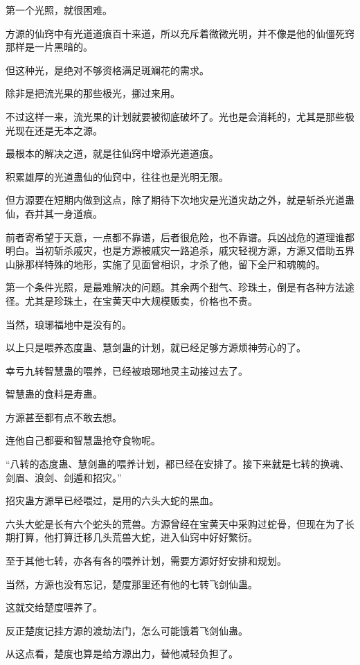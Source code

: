 \begin{this_body}
第一个光照，就很困难。

方源的仙窍中有光道道痕百十来道，所以充斥着微微光明，并不像是他的仙僵死窍那样是一片黑暗的。

但这种光，是绝对不够资格满足斑斓花的需求。

除非是把流光果的那些极光，挪过来用。

不过这样一来，流光果的计划就要被彻底破坏了。光也是会消耗的，尤其是那些极光现在还是无本之源。

最根本的解决之道，就是往仙窍中增添光道道痕。

积累雄厚的光道蛊仙的仙窍中，往往也是光明无限。

但方源要在短期内做到这点，除了期待下次地灾是光道灾劫之外，就是斩杀光道蛊仙，吞并其一身道痕。

前者寄希望于天意，一点都不靠谱，后者很危险，也不靠谱。兵凶战危的道理谁都明白。当初斩杀戚灾，也是方源被戚灾一路追杀，戚灾轻视方源，方源又借助五界山脉那样特殊的地形，实施了见面曾相识，才杀了他，留下全尸和魂魄的。

第一个条件光照，是最难解决的问题。其余两个甜气、珍珠土，倒是有各种方法途径。尤其是珍珠土，在宝黄天中大规模贩卖，价格也不贵。

当然，琅琊福地中是没有的。

以上只是喂养态度蛊、慧剑蛊的计划，就已经足够方源烦神劳心的了。

幸亏九转智慧蛊的喂养，已经被琅琊地灵主动接过去了。

智慧蛊的食料是寿蛊。

方源甚至都有点不敢去想。

连他自己都要和智慧蛊抢夺食物呢。

“八转的态度蛊、慧剑蛊的喂养计划，都已经在安排了。接下来就是七转的换魂、剑眉、浪剑、剑遁和招灾。”

招灾蛊方源早已经喂过，是用的六头大蛇的黑血。

六头大蛇是长有六个蛇头的荒兽。方源曾经在宝黄天中采购过蛇骨，但现在为了长期打算，他打算迁移几头荒兽大蛇，进入仙窍中好好繁衍。

至于其他七转，亦各有各的喂养计划，需要方源好好安排和规划。

当然，方源也没有忘记，楚度那里还有他的七转飞剑仙蛊。

这就交给楚度喂养了。

反正楚度记挂方源的渡劫法门，怎么可能饿着飞剑仙蛊。

从这点看，楚度也算是给方源出力，替他减轻负担了。

\end{this_body}

